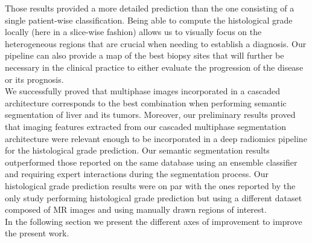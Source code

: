 Those results provided a more detailed prediction than the one
consisting of a single patient-wise classification. Being able to
compute the histological grade locally (here in a slice-wise fashion)
allows us to visually focus on the heterogeneous regions that are
crucial when needing to establish a diagnosis. Our pipeline can also
provide a map of the best biopsy sites that will further be necessary in
the clinical practice to either evaluate the progression of the disease
or its prognosis.\\
We successfully proved that multiphase images incorporated in a cascaded architecture corresponds to the best combination when performing semantic segmentation of liver and its tumors. Moreover, our preliminary results proved that imaging features extracted from our cascaded multiphase segmentation architecture were relevant enough to be incorporated in a deep radiomics pipeline for the histological grade prediction. 
Our semantic segmentation results outperformed those reported on the same database using an ensemble classifier and requiring expert interactions during the segmentation process.
Our histological grade prediction results were on par with the ones reported by the only study performing histological grade prediction but using a different dataset composed of MR images and using manually drawn regions of interest.\\
In the following section we present the different axes of improvement to improve the present work.

